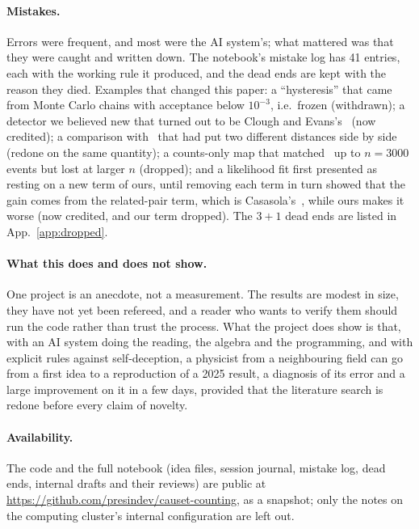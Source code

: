 \documentclass[11pt,a4paper]{article}
\begin{document}
\paragraph{Mistakes.} Errors were frequent, and most were the AI system's; what mattered was that they were caught and written down. The notebook's mistake log has 41 entries, each with the working rule it produced, and the dead ends are kept with the reason they died. Examples that changed this paper: a ``hysteresis'' that came from Monte Carlo chains with acceptance below $10^{-3}$, i.e.\ frozen (withdrawn); a detector we believed new that turned out to be Clough and Evans's~\cite{CloughEvans16} (now credited); a comparison with~\cite{Johnston25} that had put two different distances side by side (redone on the same quantity); a counts-only map that matched~\cite{Johnston25} up to $n=3000$ events but lost at larger $n$ (dropped); and a likelihood fit first presented as resting on a new term of ours, until removing each term in turn showed that the gain comes from the related-pair term, which is Casasola's~\cite{Casasola26}, while ours makes it worse (now credited, and our term dropped). The $3+1$ dead ends are listed in App.~\ref{app:dropped}.

\paragraph{What this does and does not show.} One project is an anecdote, not a measurement. The results are modest in size, they have not yet been refereed, and a reader who wants to verify them should run the code rather than trust the process. What the project does show is that, with an AI system doing the reading, the algebra and the programming, and with explicit rules against self-deception, a physicist from a neighbouring field can go from a first idea to a reproduction of a 2025 result, a diagnosis of its error and a large improvement on it in a few days, provided that the literature search is redone before every claim of novelty.

\paragraph{Availability.} The code and the full notebook (idea files, session journal, mistake log, dead ends, internal drafts and their reviews) are public at \url{https://github.com/presindev/causet-counting}, as a snapshot; only the notes on the computing cluster's internal configuration are left out.
\end{document}
